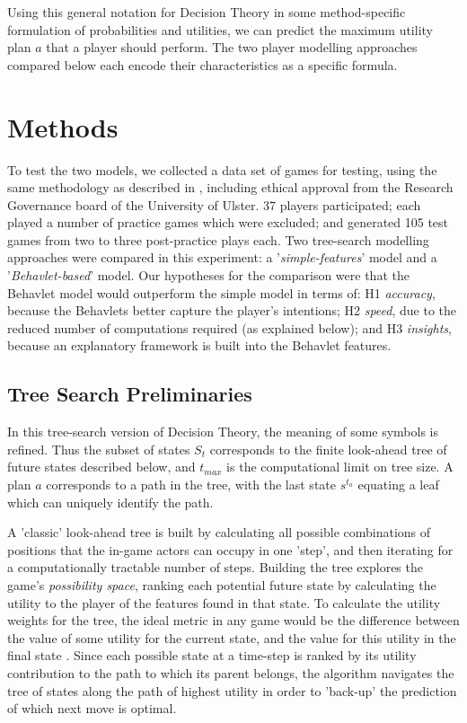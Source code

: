 \documentclass[conference]{IEEEtran}
\begin{document}
Using this general notation for Decision Theory in some method-specific formulation of probabilities and utilities, we can predict the maximum utility plan $a$ that a player should perform. The two player modelling approaches compared below each encode their characteristics as a specific formula.

\section{Methods}
\label{methods}
To test the two models, we collected a data set of games for testing, using the same methodology as described in \cite{Cowley2016behavlet}, including ethical approval from the Research Governance board of the University of Ulster. 37 players participated; each played a number of practice games which were excluded; and generated 105 test games from two to three post-practice plays each. Two tree-search modelling approaches were compared in this experiment: a '\textit{simple-features}' model and a '\textit{Behavlet-based}' model. Our hypotheses for the comparison were that the Behavlet model would outperform the simple model in terms of: \textsf{H1} \textit{accuracy}, because the Behavlets better capture the player's intentions; \textsf{H2} \textit{speed}, due to the reduced number of computations required (as explained below); and \textsf{H3} \textit{insights}, because an explanatory framework is built into the Behavlet features.

\subsection{Tree Search Preliminaries}
In this tree-search version of Decision Theory, the meaning of some symbols is refined. Thus the subset of states $S_t$ corresponds to the finite look-ahead tree of future states described below, and $t_{max}$ is the computational limit on tree size. A plan $a$ corresponds to a path in the tree, with the last state $s^{t_a}$ equating a leaf which can uniquely identify the path.

A 'classic' look-ahead tree is built by calculating all possible combinations of positions that the in-game actors can occupy in one 'step', and then iterating for a computationally tractable number of steps. Building the tree explores the game's \textit{possibility space}, ranking each potential future state by calculating the utility to the player of the features found in that state. To calculate the utility weights for the tree, the ideal metric in any game would be the difference between the value of some utility for the current state, and the value for this utility in the final state \cite{Samuel1959}. Since each possible state at a time-step is ranked by its utility contribution to the path to which its parent belongs, the algorithm navigates the tree of states along the path of highest utility in order to 'back-up' the prediction of which next move is optimal.
\end{document}
